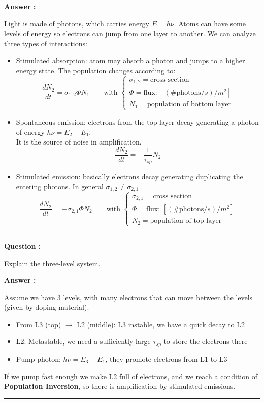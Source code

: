 \documentclass[a4paper,11pt]{book}
\newcounter{qacount}
\newenvironment{question}{
  \refstepcounter{qacount}
  \vspace{1em} %
  \noindent\textbf{Question \theqacount:}\space
}{
  \par %
}
\newenvironment{answer}{
  \noindent\textbf{Answer \theqacount:}\space
}{
  \par\vspace{1em}   %
  \hrule             %
  \vspace{0.5em}     %
}
\begin{document}
\begin{answer}
    Light is made of photons, which carries energy $E = h\nu$. Atoms can have some levels of energy so electrons can jump from one layer to another.
    We can analyze three types of interactions:
    \begin{itemize}
        \item Stimulated absorption: atom may absorb a photon and jumps to a higher energy state. The population changes according to:
              $$\frac{dN_2}{dt} = \sigma_{1,2}\Phi N_1 \qquad \text{with }\begin{cases}
                      \sigma_{1,2} = \text{cross section}                         \\
                      \Phi = \text{flux: }\left[(\#\text{photons} / s)/m^2\right] \\
                      N_1 = \text{population of bottom layer}
                  \end{cases}$$
        \item Spontaneous emission: electrons from the top layer decay generating a photon of energy $h\nu = E_2 - E_1$.\\
              It is the source of noise in amplification.
              $$\frac{dN_2}{dt} = -\frac{1}{\tau_{sp}}N_2$$
        \item Stimulated emission: basically electrons decay generating duplicating the entering photons. In general $\sigma_{1,2} \neq \sigma_{2,1}$
              $$\frac{dN_2}{dt} = -\sigma_{2,1}\Phi N_2 \qquad \text{with }\begin{cases}
                      \sigma_{2,1} = \text{cross section}                         \\
                      \Phi = \text{flux: }\left[(\#\text{photons} / s)/m^2\right] \\
                      N_2 = \text{population of top layer}
                  \end{cases}$$


    \end{itemize}
\end{answer}

\begin{question}
    Explain the three-level system.
\end{question}

\begin{answer}
    Assume we have 3 levels, with many electrons that can move between the levels (given by doping material).
    \begin{itemize}
        \item From L3 (top) $\to$ L2 (middle): L3 instable, we have a quick decay to L2
        \item L2: Metastable, we need a sufficiently large $\tau_{sp}$ to store the electrons there
        \item Pump-photon: $h\nu = E_3 - E_1$, they promote electrons from L1 to L3
    \end{itemize}
    If we pump fast enough we make L2 full of electrons, and we reach a condition of \textbf{Population Inversion}, so there is amplification by stimulated emissions.\\
\end{answer}
\end{document}
